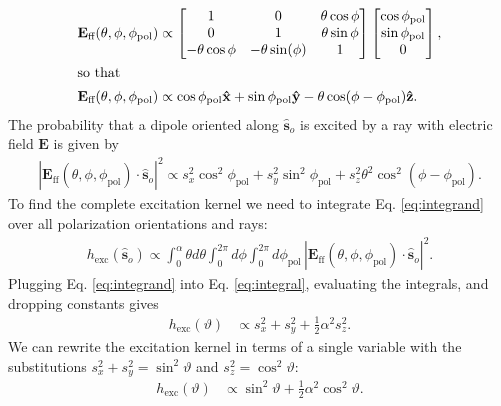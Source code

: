 \documentclass[]{osa-article}
\providecommand{\mb}[1]{\mathbf{#1}}
\providecommand{\so}{\mathbf{\hat{s}}_o}
\providecommand{\mh}[1]{\mathbf{\hat{#1}}}
\begin{document}
\begin{align}
  \mb{E}_{\text{ff}}(\theta, \phi, \phi_{\text{pol}}) & \propto 
  \begin{bmatrix}
    1 & 0 &\theta \cos\phi\\
    0 & 1 &\theta \sin\phi\\
    -\theta\cos\phi&-\theta \sin(\phi)&1
  \end{bmatrix}
  \begin{bmatrix}
    \cos\phi_{\text{pol}}\\
    \sin\phi_{\text{pol}}\\
    0
  \end{bmatrix},\\
  \intertext{so that}
  \mb{E}_{\text{ff}}(\theta, \phi, \phi_{\text{pol}}) &\propto \cos\phi_{\text{pol}}\mh{x} + \sin\phi_{\text{pol}}\mh{y} - \theta\cos(\phi - \phi_{\text{pol}})\mh{z}.\label{eq:eff}
\end{align}
The probability that a dipole oriented along $\so{}$ is excited by a ray with
electric field $\mb{E}$ is given by 
\begin{align}
  |\mb{E}_{\text{ff}}(\theta, \phi, \phi_{\text{pol}}) \cdot \so{}|^2 \propto s_x^2\cos^2\phi_{\text{pol}} + s_y^2\sin^2\phi_{\text{pol}} + s_z^2\theta^2\cos^2(\phi - \phi_{\text{pol}}). \label{eq:integrand}
\end{align}
To find the complete excitation kernel we need to integrate Eq.
\ref{eq:integrand} over all polarization orientations and rays:
\begin{align}
  h_{\text{exc}}(\so{}) \propto \int_0^{\alpha}\theta d\theta\int_0^{2\pi}d\phi\int_0^{2\pi}d\phi_{\text{pol}}\, |\mb{E}_{\text{ff}}(\theta, \phi, \phi_{\text{pol}}) \cdot \so{}|^2. \label{eq:integral}
\end{align}
Plugging Eq. \ref{eq:integrand} into Eq. \ref{eq:integral}, evaluating the
integrals, and dropping constants gives
\begin{align}
  h_{\text{exc}}(\vartheta) &\propto s_x^2 + s_y^2 + \frac{1}{2}\alpha^2s_z^2.
\end{align}
We can rewrite the excitation kernel in terms of a single variable with the
substitutions $s_x^2 + s_y^2 = \sin^2\vartheta$ and $s_z^2 = \cos^2\vartheta$:
\begin{align}
  h_{\text{exc}}(\vartheta) &\propto \sin^2\vartheta + \frac{1}{2}\alpha^2\cos^2\vartheta \label{eq:hexctheta}.
\end{align}
\end{document}
